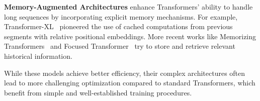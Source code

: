 \textbf{Memory-Augmented Architectures} enhance Transformers' ability to handle long sequences by incorporating explicit memory mechanisms. For example, Transformer-XL~\cite{transformer-xl} pioneered the use of cached computations from previous segments with relative positional embeddings. More recent works like Memorizing Transformers~\cite{memorizingtransformers} and Focused Transformer~\cite{focusedtransformer} try to store and retrieve relevant historical information.

While these models achieve better efficiency, their complex architectures often lead to more challenging optimization compared to standard Transformers, which benefit from simple and well-established training procedures.





